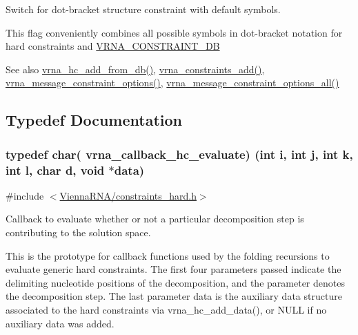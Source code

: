 Switch for dot-\/bracket structure constraint with default symbols. 

This flag conveniently combines all possible symbols in dot-\/bracket notation for hard constraints and \hyperlink{group__hard__constraints_ga4bfc2f15c4f261c62a11af9d2aa80c90}{V\+R\+N\+A\+\_\+\+C\+O\+N\+S\+T\+R\+A\+I\+N\+T\+\_\+\+DB}

\begin{DoxySeeAlso}{See also}
\hyperlink{group__hard__constraints_ga5b4de3247b67358080c176b94591a8e6}{vrna\+\_\+hc\+\_\+add\+\_\+from\+\_\+db()}, \hyperlink{group__constraints_ga35a401f680969a556858a8dd5f1d07cc}{vrna\+\_\+constraints\+\_\+add()}, \hyperlink{group__constraints_gaa1f20b53bf09ac2e6b0dbb13f7d89670}{vrna\+\_\+message\+\_\+constraint\+\_\+options()}, \hyperlink{group__constraints_gaec7e13fa0465c2acc7a621d1aecb709f}{vrna\+\_\+message\+\_\+constraint\+\_\+options\+\_\+all()} 
\end{DoxySeeAlso}


\subsection{Typedef Documentation}
\subsubsection[{\texorpdfstring{vrna\+\_\+callback\+\_\+hc\+\_\+evaluate}{vrna_callback_hc_evaluate}}]{\setlength{\rightskip}{0pt plus 5cm}typedef char( vrna\+\_\+callback\+\_\+hc\+\_\+evaluate) (int i, int j, int k, int l, char d, void $\ast$data)}\hypertarget{group__hard__constraints_ga16eb71ac9a7a35369be2eaa9d8f8dfa0}{}\label{group__hard__constraints_ga16eb71ac9a7a35369be2eaa9d8f8dfa0}


{\ttfamily \#include $<$\hyperlink{constraints__hard_8h}{Vienna\+R\+N\+A/constraints\+\_\+hard.\+h}$>$}



Callback to evaluate whether or not a particular decomposition step is contributing to the solution space. 

This is the prototype for callback functions used by the folding recursions to evaluate generic hard constraints. The first four parameters passed indicate the delimiting nucleotide positions of the decomposition, and the parameter {\ttfamily denotes} the decomposition step. The last parameter {\ttfamily data} is the auxiliary data structure associated to the hard constraints via vrna\+\_\+hc\+\_\+add\+\_\+data(), or N\+U\+LL if no auxiliary data was added.

